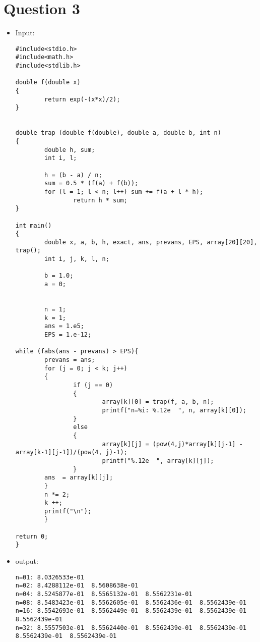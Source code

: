 \documentclass[10pt]{article}
\begin{document}
\section{Question 3}
\begin{itemize}
\item Input:
\begin{verbatim}
#include<stdio.h>
#include<math.h>
#include<stdlib.h>

double f(double x)
{
        return exp(-(x*x)/2);
}


double trap (double f(double), double a, double b, int n)
{
        double h, sum;
        int i, l;

        h = (b - a) / n;                                      
        sum = 0.5 * (f(a) + f(b));                            
        for (l = 1; l < n; l++) sum += f(a + l * h);  
                return h * sum;                     
}

int main()
{
        double x, a, b, h, exact, ans, prevans, EPS, array[20][20], trap();
        int i, j, k, l, n;

        b = 1.0;
        a = 0;


        n = 1;
        k = 1;
        ans = 1.e5;
        EPS = 1.e-12;

while (fabs(ans - prevans) > EPS){
        prevans = ans;
        for (j = 0; j < k; j++)
        {
                if (j == 0)
                {
                        array[k][0] = trap(f, a, b, n);
                        printf("n=%i: %.12e  ", n, array[k][0]);
                }
                else
                {
                        array[k][j] = (pow(4,j)*array[k][j-1] - array[k-1][j-1])/(pow(4, j)-1); 
                        printf("%.12e  ", array[k][j]);
                }
        ans  = array[k][j];
        }
        n *= 2;
        k ++;
        printf("\n");
        }	

return 0;
}
\end{verbatim}
\item output:
\begin{verbatim}
n=01: 8.0326533e-01  
n=02: 8.4288112e-01  8.5608638e-01  
n=04: 8.5245877e-01  8.5565132e-01  8.5562231e-01  
n=08: 8.5483423e-01  8.5562605e-01  8.5562436e-01  8.5562439e-01  
n=16: 8.5542693e-01  8.5562449e-01  8.5562439e-01  8.5562439e-01  8.5562439e-01  
n=32: 8.5557503e-01  8.5562440e-01  8.5562439e-01  8.5562439e-01  8.5562439e-01  8.5562439e-01
\end{verbatim}
\end{itemize}
\end{document}
